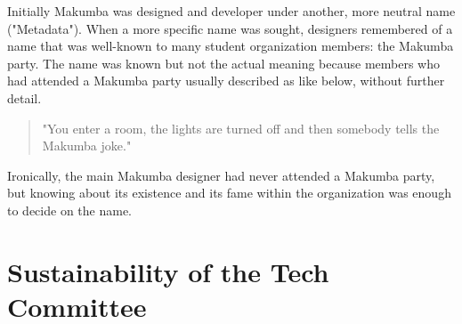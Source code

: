 \documentclass{sig-alt-release2}
\begin{document}
Initially Makumba was designed and developer under another, more neutral name ("Metadata"). When a more specific name was sought, designers remembered of a name that was well-known to many student organization members: the Makumba party. The name was known but not the actual meaning because members who had attended a Makumba party usually described as like below, without further detail. 
\begin{quotation}
	"You enter a room, the lights are turned off and then somebody tells the Makumba joke."
\end{quotation}

Ironically, the main Makumba designer had never attended a Makumba party, but knowing about its existence and its fame within the organization was enough to decide on the name.

\section{Sustainability of the Tech Committee}\label{sec:techCommittee}
\end{document}
